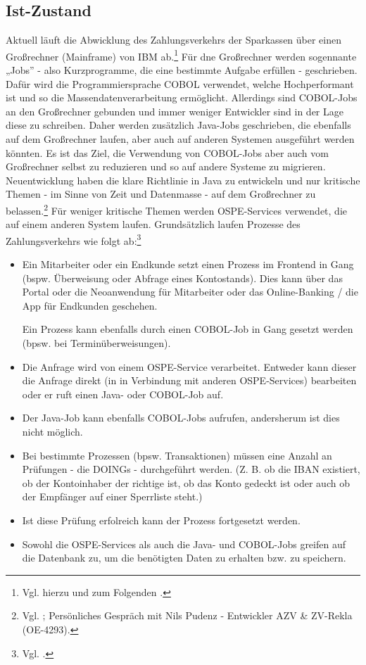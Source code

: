 \subsection{Ist-Zustand}
\label{sec:ist-zustand}
Aktuell läuft die Abwicklung des Zahlungsverkehrs der Sparkassen über einen Großrechner (Mainframe) von IBM ab.\footnote{Vgl. hierzu und zum Folgenden \pageref{i1:f4}.}
Für dne Großrechner werden sogennante „Jobs” - also Kurzprogramme, die eine bestimmte Aufgabe erfüllen - geschrieben. Dafür wird die Programmiersprache COBOL verwendet, welche Hochperformant ist und so die Massendatenverarbeitung ermöglicht.
Allerdings sind COBOL-Jobs an den Großrechner gebunden und immer weniger Entwickler sind in der Lage diese zu schreiben.
Daher werden zusätzlich Java-Jobs geschrieben, die ebenfalls auf dem Großrechner laufen, aber auch auf anderen Systemen ausgeführt werden könnten.
Es ist das Ziel, die Verwendung von COBOL-Jobs aber auch vom Großrechner selbst zu reduzieren und so auf andere Systeme zu migrieren.
Neuentwicklung haben die klare Richtlinie in Java zu entwickeln und nur kritische Themen - im Sinne von Zeit und Datenmasse - auf dem Großrechner zu belassen.\footnote{Vgl. \pageref{i1:f4}; Persönliches Gespräch mit Nils Pudenz - Entwickler AZV \& ZV-Rekla (OE-4293).}
Für weniger kritische Themen werden OSPE-Services verwendet, die auf einem anderen System laufen.
Grundsätzlich laufen Prozesse des Zahlungsverkehrs wie folgt ab:\footnote{Vgl. \pageref{a1}.}
\begin{itemize}
    \item Ein Mitarbeiter oder ein Endkunde setzt einen Prozess im Frontend in Gang (bspw. Überweisung oder Abfrage eines Kontostands).
    Dies kann über das Portal oder die Neoanwendung für Mitarbeiter oder das Online-Banking / die App für Endkunden geschehen.

    Ein Prozess kann ebenfalls durch einen COBOL-Job in Gang gesetzt werden (bpsw. bei Terminüberweisungen).
    \item Die Anfrage wird von einem OSPE-Service verarbeitet.
    Entweder kann dieser die Anfrage direkt (in in Verbindung mit anderen OSPE-Services) bearbeiten oder er ruft einen Java- oder COBOL-Job auf.
    \item Der Java-Job kann ebenfalls COBOL-Jobs aufrufen, andersherum ist dies nicht möglich.
    \item Bei bestimmte Prozessen (bpsw. Transaktionen) müssen eine Anzahl an Prüfungen - die DOINGs - durchgeführt werden. 
    (Z. B. ob die IBAN existiert, ob der Kontoinhaber der richtige ist, ob das Konto gedeckt ist oder auch ob der Empfänger auf einer Sperrliste steht.) 
    \item Ist diese Prüfung erfolreich kann der Prozess fortgesetzt werden.
    \item Sowohl die OSPE-Services als auch die Java- und COBOL-Jobs greifen auf die Datenbank zu, um die benötigten Daten zu erhalten bzw. zu speichern. 
\end{itemize}

